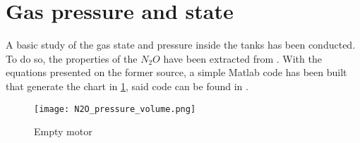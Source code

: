 
\section*{Gas pressure and state}

A basic study of the gas state and pressure inside the tanks has been conducted. To do so, the properties of the $N_2O$ have been extracted from \cite{n2oReference}. With the equations presented on the former source, a simple Matlab code has been built that generate the chart in \ref{fig:N2O_P_V_graph}, said code can be found in \cite{MatlabPVchart}.

\begin{figure}[H]
  \centering
  \texttt{[image: N2O\_pressure\_volume.png]}
  \caption{Empty motor}
  \label{fig:N2O_P_V_graph}
\end{figure}